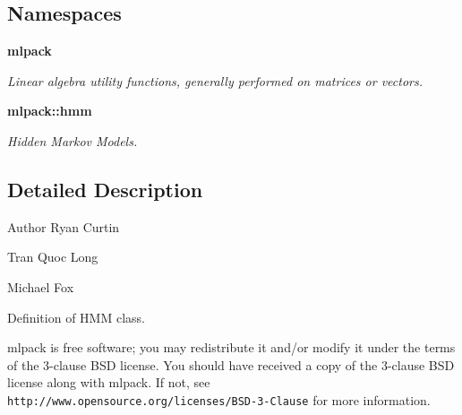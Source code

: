 \subsection*{Namespaces}
\begin{DoxyCompactItemize}
\item 
 {\bf mlpack}
\begin{DoxyCompactList}\small\item\em Linear algebra utility functions, generally performed on matrices or vectors. \end{DoxyCompactList}\item 
 {\bf mlpack\+::hmm}
\begin{DoxyCompactList}\small\item\em Hidden Markov Models. \end{DoxyCompactList}\end{DoxyCompactItemize}


\subsection{Detailed Description}
\begin{DoxyAuthor}{Author}
Ryan Curtin 

Tran Quoc Long 

Michael Fox
\end{DoxyAuthor}
Definition of H\+MM class.

mlpack is free software; you may redistribute it and/or modify it under the terms of the 3-\/clause B\+SD license. You should have received a copy of the 3-\/clause B\+SD license along with mlpack. If not, see {\tt http\+://www.\+opensource.\+org/licenses/\+B\+S\+D-\/3-\/\+Clause} for more information. 